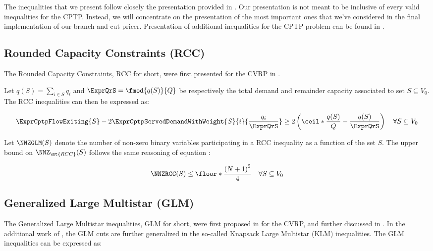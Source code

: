 The inequalities that we present follow closely the presentation provided in \textcite{jepsen2014}.
Our presentation is not meant to be inclusive of every valid inequalities for the CPTP.
Instead, we will concentrate on the presentation of the most important ones
that we've considered in the final implementation of our branch-and-cut pricer.
Presentation of additional inequalities for the CPTP problem can be found in \textcite{jepsen2014}.


\subsection{Rounded Capacity Constraints (RCC)}
\label{sec:cptp-rcc}

The Rounded Capacity Constraints, RCC for short, were first presented
for the CVRP  in \cite{laporte1983}.

Let $q(S) = \sum_{i \in S} q_i$ and $\ExprQrS = \fmod{q(S)}{Q}$ be respectively the total demand and remainder capacity associated to set $S \subseteq V_0$.
The RCC inequalities can then be expressed as:

\begin{equation}
	\label{eq:rcc-inequality}
	\begin{split}
		\ExprCptpFlowExiting{S} -2 \ExprCptpServedDemandWithWeight{S}{i}{\frac{q_i}{\ExprQrS}}   \ge   2 \left( \ceil*{ \frac{q(S)}{Q}} - \frac{q(S)}{\ExprQrS} \right) \quad \forall S \subseteq V_0
	\end{split}
\end{equation}

Let $\NNZGLM(S)$ denote the number of non-zero binary variables participating in a RCC inequality as a function of the set $S$.
The upper bound on $\NNZ_{\mt{RCC}}(S)$ follows the same reasoning of equation :

\begin{equation}
	\label{eq:rc-nnz-ub}
	\NNZRCC(S) \le \floor*{\frac{\left( N + 1\right)^2}{4}} \quad \forall S \subseteq V_0
\end{equation}


\subsection{Generalized Large Multistar (GLM)}
\label{sec:cptp-glm}

The Generalized Large Multistar inequalities, GLM for short, were first proposed in \cite{gouveia1995} for the CVRP, and further discussed in \cite{letchford2006}.
In the additional work of \cite{letchford2002}, the GLM cuts are further generalized in the so-called Knapsack Large Multistar (KLM) inequalities.
The GLM inequalities can be expressed as:


